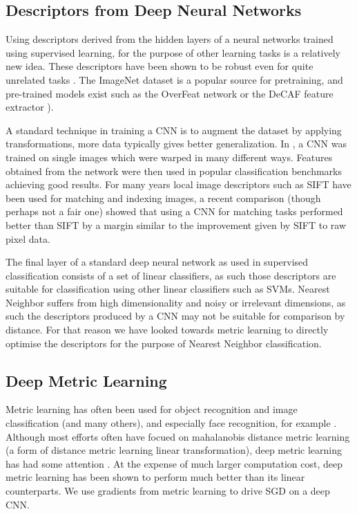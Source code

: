 \subsection {Descriptors from Deep Neural Networks}

Using descriptors derived from the hidden layers of a neural networks trained using supervised learning, for the purpose of other learning tasks is a relatively new idea. These descriptors have been shown to be robust even for quite unrelated tasks \cite{Donahue2014,Razavian2014}. The ImageNet dataset \cite{Socher2009} is a popular source for pretraining, and pre-trained models exist such as the OverFeat network \cite{Sermanet2013} or the DeCAF feature extractor \cite{Donahue2014}). 

A standard technique in training a \gls{CNN} is to augment the dataset by applying transformations, more data typically gives better generalization. In \cite{Dosovitskiy2013}, a \gls{CNN} was trained on single images which were warped in many different ways. Features obtained from the network were then used in popular classification benchmarks achieving good results. For many years local image descriptors such as \gls{SIFT} \cite{Lowe2004} have been used for matching and indexing images, a recent comparison \cite{Fischer2014} (though perhaps not a fair one) showed that using a \gls{CNN} for matching tasks performed better than \gls{SIFT} by a margin similar to the improvement given by \gls{SIFT} to raw pixel data.


The final layer of a standard deep neural network as used in supervised classification consists of a set of linear classifiers, as such those descriptors are suitable for classification using other linear classifiers such as SVMs. Nearest Neighbor suffers from high dimensionality and noisy or irrelevant dimensions, as such the descriptors produced by a CNN may not be suitable for comparison by distance. For that reason we have looked towards metric learning to directly optimise the descriptors for the purpose of Nearest Neighbor classification. 


\subsection {Deep Metric Learning}


Metric learning has often been used for object recognition and image classification \cite{Hadsell2006,Min2009} (and many others), and especially face recognition, for example \cite{Kostinger2012}. Although most efforts often have focued on mahalanobis distance metric learning (a form of distance metric learning linear transformation), deep metric learning has had some attention \cite {Salakhutdinov2007a,Min2009,Weston2009,Min2010}. At the expense of much larger computation cost, deep metric learning has been shown to perform much better than its linear counterparts. We use gradients from metric learning to drive \gls{SGD} on a deep \gls{CNN}. 

